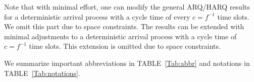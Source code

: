 Note that with minimal effort, one can modify the general ARQ/HARQ results for a deterministic arrival process with a cycle time of every $c = f^{-1}$ time slots. We omit this part due to space constraints.
The results can be extended with minimal adjustments to a deterministic arrival process with a cycle time of $c = f^{-1}$ time slots. This extension is omitted due to space constraints.

We summarize important abbreviations in TABLE~\ref{Tab:abbr} and notations in TABLE~\ref{Tab:notations}.

